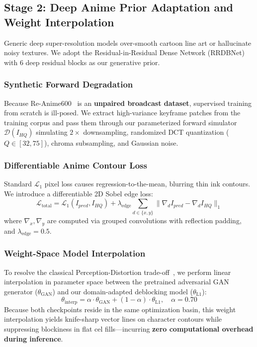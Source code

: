 \documentclass[conference]{IEEEtran}
\begin{document}
\subsection{Stage 2: Deep Anime Prior Adaptation and Weight Interpolation}
Generic deep super-resolution models over-smooth cartoon line art or hallucinate noisy textures. We adopt the Residual-in-Residual Dense Network (RRDBNet)~\cite{wang2018esrgan,jiang2024apisr} with 6 deep residual blocks as our generative prior.

\subsubsection{Synthetic Forward Degradation}
Because Re-Anime600~\cite{fargetta2026re} is an \textbf{unpaired broadcast dataset}, supervised training from scratch is ill-posed. We extract high-variance keyframe patches from the training corpus and pass them through our parameterized forward simulator $\mathcal{D}(I_{HQ})$ simulating $2\times$ downsampling, randomized DCT quantization ($Q \in [32, 75]$), chroma subsampling, and Gaussian noise.

\subsubsection{Differentiable Anime Contour Loss}
Standard $\mathcal{L}_1$ pixel loss causes regression-to-the-mean, blurring thin ink contours. We introduce a differentiable 2D Sobel edge loss:
\begin{equation}
\mathcal{L}_{\text{total}} = \mathcal{L}_1(I_{pred}, I_{HQ}) + \lambda_{\text{edge}} \sum_{d \in \{x, y\}} \|\nabla_d I_{pred} - \nabla_d I_{HQ}\|_1
\end{equation}
where $\nabla_x, \nabla_y$ are computed via grouped convolutions with reflection padding, and $\lambda_{\text{edge}} = 0.5$.

\subsubsection{Weight-Space Model Interpolation}
To resolve the classical Perception-Distortion trade-off~\cite{blau2018perception}, we perform linear interpolation in parameter space between the pretrained adversarial GAN generator ($\theta_{\text{GAN}}$) and our domain-adapted deblocking model ($\theta_{\text{L1}}$):
\begin{equation}
\theta_{\text{interp}} = \alpha \cdot \theta_{\text{GAN}} + (1 - \alpha) \cdot \theta_{\text{L1}}, \quad \alpha = 0.70
\end{equation}
Because both checkpoints reside in the same optimization basin, this weight interpolation yields knife-sharp vector lines on character contours while suppressing blockiness in flat cel fills---incurring \textbf{zero computational overhead during inference}.
\end{document}

